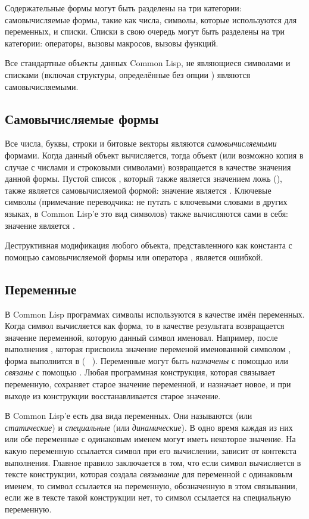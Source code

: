 Содержательные формы могут быть разделены на три категории:
самовычисляемые формы, такие как числа,
символы, которые используются для переменных,
и списки. Списки в свою очередь могут быть разделены на три категории:
операторы, 
вызовы макросов,
вызовы функций.

Все стандартные объекты данных Common Lisp, не являющиеся символами и списками
(включая  структуры, определённые без опции ) являются
самовычисляемыми. 

\subsection{Самовычисляемые формы}

Все числа, буквы, строки и битовые векторы являются
\emph{самовычисляемыми} формами.
Когда данный объект вычисляется, тогда объект (или возможно копия в случае с
числами и строковыми символами) возвращается в качестве значения данной
формы. Пустой список {\emptylist}, который также является значением ложь
({\false}), также является самовычисляемой формой: значение {\false} является
{\false}.
Ключевые символы (примечание переводчика: не путать с ключевыми словами в других
языках, в Common Lisp'е это вид символов) также вычисляются сами в себя:
значение  является .

Деструктивная модификация любого объекта, представленного как
константа с помощью самовычисляемой формы или оператора ,
является ошибкой.

\subsection{Переменные}

В Common Lisp программах символы используются в качестве имён переменных.
Когда символ вычисляется как форма, то в качестве результата возвращается
значение переменной, которую данный символ именовал. Например, после выполнения
, которая присвоила значение  переменой именованной
символом , форма  выполнится в  ( \EV\
).
Переменные могут быть \emph{назначены} с помощью  или \emph{связаны} с
помощью \cdf{let}.
Любая программная конструкция, которая связывает переменную, сохраняет старое
значение переменной, и назначает новое, и при выходе из конструкции
восстанавливается старое значение.

В Common Lisp'е есть два вида переменных. Они называются  (или
\emph{статические}) и \emph{специальные} (или \emph{динамические}).
В одно время каждая из них или обе переменные с одинаковым именем могут иметь
некоторое значение. На какую переменную ссылается символ при его вычислении,
зависит от контекста выполнения. Главное правило заключается в том, что если
символ вычисляется в тексте конструкции, которая создала \emph{связывание} для
переменной с одинаковым именем, то символ ссылается на переменную, обозначенную
в этом связывании, если же в тексте такой конструкции нет, то символ ссылается
на специальную переменную.


